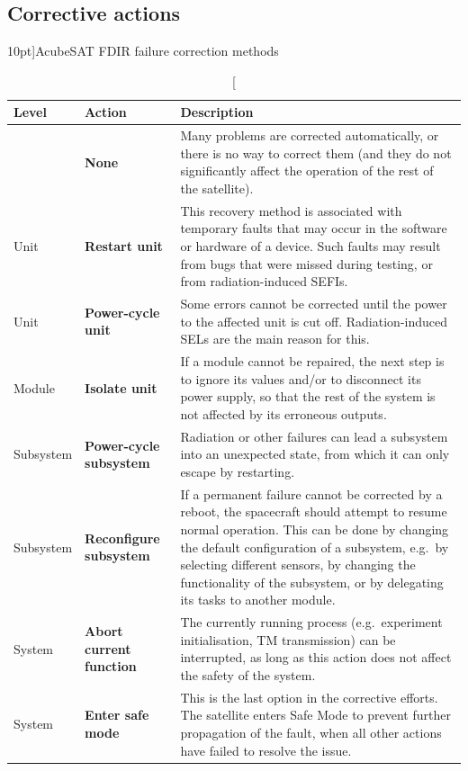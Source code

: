 \documentclass[a4paper,nobib]{tufte-book}
\begin{document}
\clearpage
\subsection{Corrective actions}

\begin{table}[h]
	\centering
	\caption[][10pt]{AcubeSAT \acs{FDIR} failure correction methods}
	\label{tab:fdir_correction}
	\renewcommand{\arraystretch}{1.5}
	\begin{tabularx}{\textwidth}{@{}lL{3cm}X@{}}
		\toprule
		Level & Action & Description \\ \midrule
		& \textbf{None} & Many problems are corrected automatically, or there is no way to correct them (and they do not significantly affect the operation of the rest of the satellite). \\
		Unit & \textbf{Restart unit} & This recovery method is associated with temporary faults that may occur in the software or hardware of a device. Such faults may result from bugs that were missed during testing, or from radiation-induced \acsp{SEFI}. \\
		Unit & \textbf{Power-cycle unit} & Some errors cannot be corrected until the power to the affected unit is cut off. Radiation-induced \acsp{SEL} are the main reason for this. \\
		Module & \textbf{Isolate unit} & If a module cannot be repaired, the next step is to ignore its values and/or to disconnect its power supply, so that the rest of the system is not affected by its erroneous outputs. \\
		Subsystem & \textbf{Power-cycle subsystem} & Radiation or other failures can lead a subsystem into an unexpected state, from which it can only escape by restarting. \\
		Subsystem & \textbf{Reconfigure subsystem} & If a permanent failure cannot be corrected by a reboot, the spacecraft should attempt to resume normal operation. This can be done by changing the default configuration of a subsystem, e.g.\ by selecting different sensors, by changing the functionality of the subsystem, or by delegating its tasks to another module. \\
		System & \textbf{Abort current function} & The currently running process (e.g.\ experiment initialisation, \acs{TM} transmission) can be interrupted, as long as this action does not affect the safety of the system. \\
		System & \textbf{Enter safe mode} & This is the last option in the corrective efforts. The satellite enters Safe Mode to prevent further propagation of the fault, when all other actions have failed to resolve the issue. \\ \bottomrule
	\end{tabularx}
\end{table}
\end{document}
